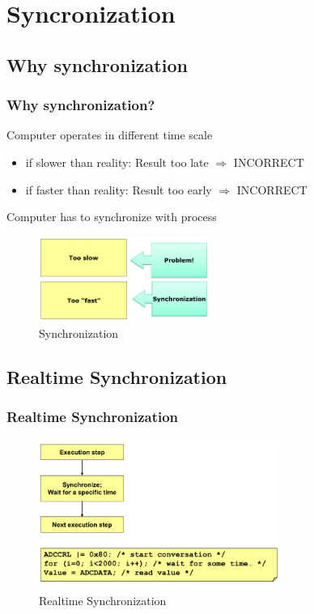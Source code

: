 \section{Syncronization}
\subsection{Why synchronization}
\begin{frame}
    \frametitle{Why synchronization?}
    Computer operates in different time scale
    \begin{itemize}
        \item if slower than reality: Result too late $\Rightarrow$ INCORRECT
        \item if faster than reality: Result too early $\Rightarrow$ INCORRECT
    \end{itemize}
    Computer has to synchronize with process
    \begin{figure}
        \includegraphics[width=0.5\textwidth]{fig/synchronization.png}
        \caption{Synchronization}
    \end{figure}
\end{frame}

\subsection{Realtime Synchronization}
\begin{frame}
    \frametitle{Realtime Synchronization}
    \begin{figure}
        \includegraphics[width=0.7\textwidth]{fig/realtime.png}
        \caption{Realtime Synchronization}
    \end{figure}
\end{frame}

